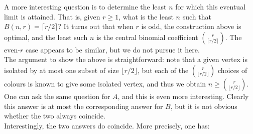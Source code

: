 \documentclass[11pt,a4paper]{article}
\begin{document}
\noindent
A more interesting question is to determine the least $n$ for which this eventual limit is attained. That is, given $r\geq 1$, what is the least $n$ such that $B(n,r)=\lceil r/2 \rceil$? It turns out that when $r$ is odd, the construction above is optimal, and the least such $n$ is the central binomial coefficient $
\binom{r}{\lceil r/2 \rceil}.$ The even-$r$ case appears to be similar, but we do not pursue it here.\\

\noindent
The argument to show the above is straightforward: note that a given vertex is isolated by at most one subset of size $\lfloor r/2 \rfloor$, but each of the $\binom{r}{\lfloor r/2 \rfloor}$ choices of colours is known to give some isolated vertex, and thus we obtain $n \geq \binom{r}{\lfloor r/2 \rfloor}$. One can ask the same question for $A$, and this is even more interesting. Clearly this answer is at most the corresponding answer for $B$, but it is not obvious whether the two always coincide.\\

\noindent
Interestingly, the two answers do coincide. More precisely, one has: 
\end{document}
